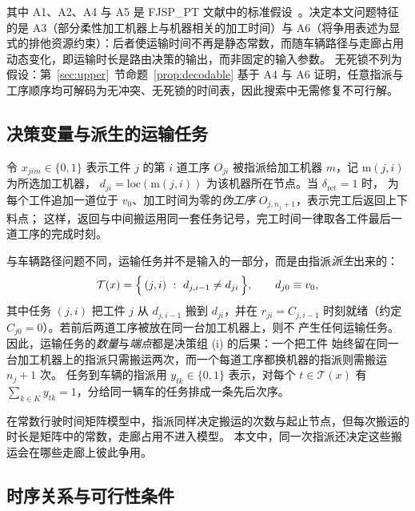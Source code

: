 \documentclass[manuscript,screen,review]{acmart}
\begin{document}
其中 A1、A2、A4 与 A5 是 FJSP\_PT 文献中的标准假设~\cite{xin2025review}。决定本文问题特征的是 A3（部分柔性加工机器上与机器相关的加工时间）与 A6（将争用表述为显式的排他资源约束）：后者使运输时间不再是静态常数，而随车辆路径与走廊占用动态变化，即运输时长是路由决策的输出，而非固定的输入参数。
无死锁不列为假设：第~\ref{sec:upper}~节命题~\ref{prop:decodable} 基于 A4 与 A6 证明，任意指派与工序顺序均可解码为无冲突、无死锁的时间表，因此搜索中无需修复不可行解。

\subsection{决策变量与派生的运输任务}

令 $x_{jim}\in\{0,1\}$ 表示工件 $j$ 的第 $i$ 道工序 $O_{ji}$ 被指派给加工机器 $m$，记 $\mathrm{m}(j,i)$ 为所选加工机器，
$d_{ji}=\mathrm{loc}(\mathrm{m}(j,i))$ 为该机器所在节点。当 $\delta_{\mathrm{ret}}=1$ 时，
为每个工件追加一道位于 $v_0$、加工时间为零的\emph{伪工序} $O_{j,n_j+1}$，表示完工后返回上下料点；
这样，返回与中间搬运用同一套任务记号，完工时间一律取各工件最后一道工序的完成时刻。

与车辆路径问题不同，运输任务并不是输入的一部分，而是由指派\emph{派生}出来的：
\begin{equation}
\label{eq:tasks}
\mathcal{T}(x)=\Bigl\{\,(j,i)\ :\ d_{j,i-1}\neq d_{ji}\,\Bigr\},
\qquad d_{j0}\equiv v_0 ,
\end{equation}
其中任务 $(j,i)$ 把工件 $j$ 从 $d_{j,i-1}$ 搬到 $d_{ji}$，并在
$r_{ji}=C_{j,i-1}$ 时刻就绪（约定 $C_{j0}=0$）。若前后两道工序被放在同一台加工机器上，则不
产生任何运输任务。因此，运输任务的\emph{数量}与\emph{端点}都是决策组 (i) 的后果：一个把工件
始终留在同一台加工机器上的指派只需搬运两次，而一个每道工序都换机器的指派则需搬运 $n_j+1$ 次。
任务到车辆的指派用 $y_{tk}\in\{0,1\}$ 表示，对每个 $t\in\mathcal{T}(x)$ 有
$\sum_{k\in K}y_{tk}=1$，分给同一辆车的任务排成一条先后次序。

在常数行驶时间矩阵模型中，指派同样决定搬运的次数与起止节点，但每次搬运的时长是矩阵中的常数，走廊占用不进入模型。
本文中，同一次指派还决定这些搬运会在哪些走廊上彼此争用。

\subsection{时序关系与可行性条件}
\end{document}
